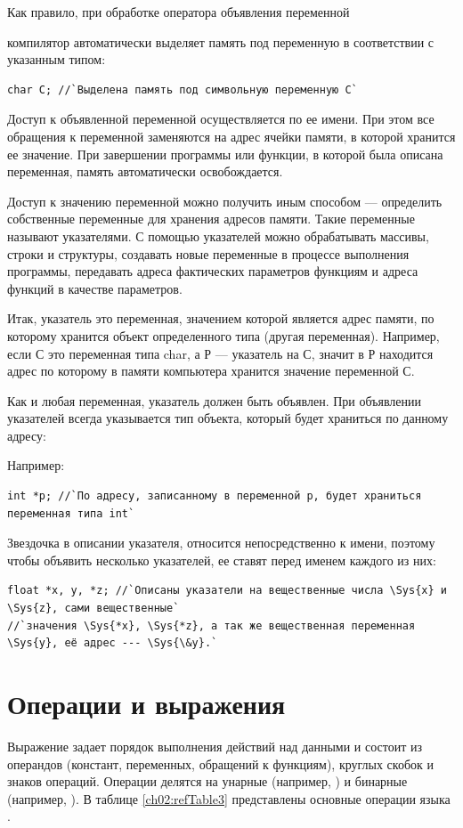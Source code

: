 Как правило, при обработке оператора объявления переменной 


компилятор автоматически выделяет память под переменную
 в соответствии с указанным типом:
\begin{lstlisting}
char C; //`Выделена память под символьную переменную C`
\end{lstlisting}
Доступ к объявленной переменной осуществляется по ее имени. При
этом все обращения к переменной заменяются на адрес ячейки памяти, в которой хранится ее значение. При завершении
программы или функции, в которой была описана переменная, память автоматически освобождается.

Доступ к значению переменной можно получить иным способом --- определить собственные
переменные для хранения адресов памяти. Такие переменные называют
указателями. С помощью указателей можно обрабатывать массивы,
строки и структуры, создавать новые переменные в процессе выполнения программы, передавать адреса фактических
параметров функциям и адреса функций в качестве параметров.

Итак, указатель это переменная, значением которой является
адрес памяти, по которому хранится объект определенного типа (другая переменная). Например, если
С это переменная типа
char, а Р --- указатель на
С, значит в Р находится адрес по которому в
памяти компьютера хранится значение переменной С.

Как и любая переменная, указатель должен быть объявлен. При
объявлении указателей всегда указывается тип объекта, который будет храниться по данному адресу:


Например:
\begin{lstlisting}
int *p; //`По адресу, записанному в переменной p, будет храниться переменная типа int`
\end{lstlisting}
Звездочка в описании указателя, относится непосредственно к имени, поэтому чтобы объявить несколько
указателей, ее ставят перед именем каждого из них: 
\begin{lstlisting}
float *x, y, *z; //`Описаны указатели на вещественные числа \Sys{x} и \Sys{z}, сами вещественные`
//`значения \Sys{*x}, \Sys{*z}, а так же вещественная переменная \Sys{y}, её адрес --- \Sys{\&y}.`
\end{lstlisting}
\section[Операции и выражения]{Операции и выражения}\label{ch02:6}
Выражение задает порядок выполнения действий над данными и состоит из
операндов (констант, переменных, обращений к функциям), круглых скобок и знаков
операций. Операции делятся на унарные
(например, ) и бинарные
(например,  ). В таблице \ref{ch02:refTable3} представлены основные операции языка .


